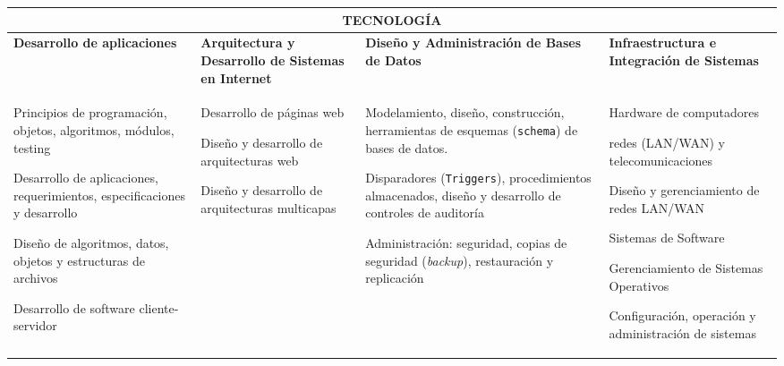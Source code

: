 \begin{center}
\begin{tabularx}{\textwidth}{|X|X|X|X|} \hline
\multicolumn{4}{|c|}{\textbf{TECNOLOGÍA}} \\ \hline
\textbf{Desarrollo de aplicaciones} & \textbf{Arquitectura y Desarrollo de Sistemas en Internet} & 
\textbf{Diseño y Administración de Bases de Datos} & \textbf{Infraestructura e Integración de Sistemas} \\ \hline

\begin{capenv}
\item Principios de programación, objetos, algoritmos, módulos, testing
\item Desarrollo de aplicaciones, requerimientos, especificaciones y desarrollo
\item Diseño de algoritmos, datos, objetos y estructuras de archivos
\item Desarrollo de software cliente-servidor
\end{capenv}
&
\begin{capenv}
\item Desarrollo de páginas web
\item Diseño y desarrollo de arquitecturas web
\item Diseño y desarrollo de arquitecturas multicapas
\end{capenv}
&
\begin{capenv}
\item Modelamiento, diseño, construcción, herramientas de esquemas (\texttt{schema}) de bases de datos.
\item Disparadores (\texttt{Triggers}), procedimientos almacenados, diseño y desarrollo de controles de auditoría
\item Administración: seguridad, copias de seguridad (\textit{backup}), restauración y replicación
\end{capenv}
&
\begin{capenv}
\item Hardware de computadores
\item redes (LAN/WAN) y telecomunicaciones
\item Diseño y gerenciamiento de redes LAN/WAN
\item Sistemas de Software
\item Gerenciamiento de Sistemas Operativos
\item Configuración, operación y administración de sistemas
\end{capenv} \\ \hline

\end{tabularx}
\end{center}

